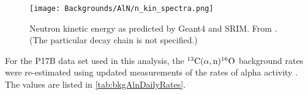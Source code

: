 \documentclass[../thesis.tex]{subfiles}
\begin{document}
\begin{figure}[ht]
  \texttt{[image: Backgrounds/AlN/n\_kin\_spectra.png]}
  \caption{Neutron kinetic energy as predicted by Geant4 and SRIM. From \cite{Zhao_2014}. (The particular decay chain is not specified.)}
  \label{fig:aln_n_kin_spectra}
\end{figure}

For the P17B data set used in this analysis, the $\CanO$ background rates were re-estimated using updated measurements of the rates of alpha activity \cite{lianghongBkg}. The values are listed in \autoref{tab:bkgAlnDailyRates}.

\begin{table}[ht]
  \caption{$\CanO$ background rates for the P17B data set \cite{lianghongBkg}.}
  \label{tab:bkgAlnDailyRates}
\end{table}

\end{document}
